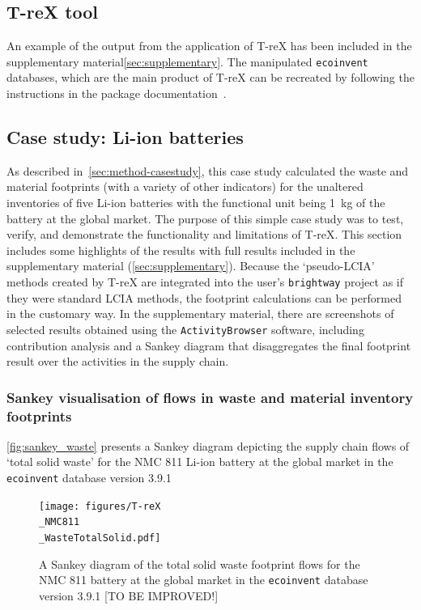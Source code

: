 \subsection{T-reX tool}\label{sec:results-T-reX}

An example of the output from the application of T-reX has been included in the supplementary material\autoref{sec:supplementary}. The manipulated \texttt{ecoinvent} databases, which are the main product of T-reX can be recreated by following the instructions in the package documentation~\citep{mcdowall2023T-reXdocs}.

\subsection{Case study: Li-ion batteries}\label{sec:results-casestudy}

As described in~\autoref{sec:method-casestudy}, this case study calculated the waste and material footprints (with a variety of other indicators) for the unaltered inventories of five Li-ion batteries with the functional unit being 1~kg of the battery at the global market. The purpose of this simple case study was to test, verify, and demonstrate the functionality and limitations of T-reX. This section includes some highlights of the results with full results included in the supplementary material (\autoref{sec:supplementary}). Because the `pseudo-LCIA' methods created by T-reX are integrated into the user's \texttt{brightway} project as if they were standard LCIA methods, the footprint calculations can be performed in the customary way. In the supplementary material, there are screenshots of selected results obtained using the \texttt{ActivityBrowser} software, including contribution analysis and a Sankey diagram that disaggregates the final footprint result over the activities in the supply chain.

\subsubsection{Sankey visualisation of flows in waste and material inventory footprints}\label{sec:results-case_study-sankey}

\autoref{fig:sankey_waste} presents a Sankey diagram depicting the supply chain flows of `total solid waste' for the NMC 811 Li-ion battery at the global market in the \texttt{ecoinvent} database version 3.9.1

\begin{figure}[H]
    \centering
    \texttt{[image: figures/T-reX\\\_NMC811\\\_WasteTotalSolid.pdf]}
    \caption{A Sankey diagram of the total solid waste footprint flows for the NMC 811 battery at the global market in the \texttt{ecoinvent} database version 3.9.1 [TO BE IMPROVED!]}\label{fig:sankey_waste}
\end{figure}

